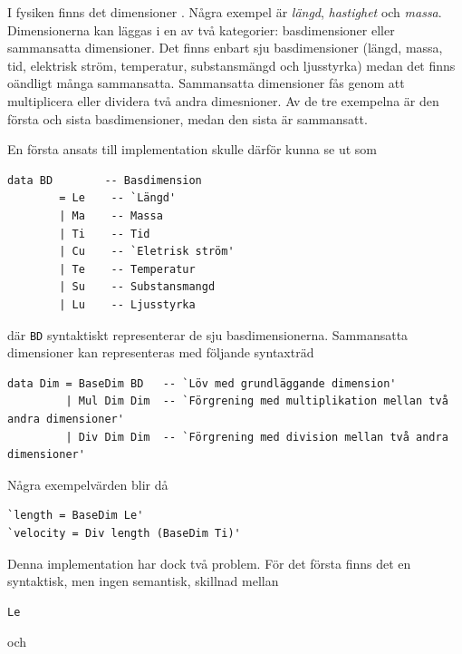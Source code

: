 \begin{draft}
I fysiken finns det dimensioner \cite{dimensioner_ne}. Några exempel är \textit{längd},
\textit{hastighet} och \textit{massa}. Dimensionerna kan läggas i en av två
kategorier: basdimensioner eller sammansatta dimensioner. Det finns enbart sju 
basdimensioner (längd, massa, tid, elektrisk ström, temperatur, substansmängd och
ljusstyrka) medan det finns oändligt många sammansatta. Sammansatta
dimensioner fås genom att multiplicera eller dividera två andra dimesnioner. Av
de tre exempelna är den första och sista basdimensioner, medan den sista är
sammansatt.

En första ansats till implementation skulle därför kunna se ut som

\begin{lstlisting}[frame=none, belowskip=-0.5\baselineskip, xleftmargin=0.5in]
 data BD        -- Basdimension
        = Le    -- `Längd'
        | Ma    -- Massa
        | Ti    -- Tid
        | Cu    -- `Eletrisk ström'
        | Te    -- Temperatur
        | Su    -- Substansmangd
        | Lu    -- Ljusstyrka
\end{lstlisting}

där \texttt{BD} syntaktiskt representerar de sju basdimensionerna.
Sammansatta dimensioner kan representeras med följande syntaxträd

\begin{lstlisting}[frame=none, belowskip=-0.5\baselineskip, xleftmargin=0.5in]
data Dim = BaseDim BD   -- `Löv med grundläggande dimension'
         | Mul Dim Dim  -- `Förgrening med multiplikation mellan två andra dimensioner'
         | Div Dim Dim  -- `Förgrening med division mellan två andra dimensioner'
\end{lstlisting}

Några exempelvärden blir då

\begin{lstlisting}[frame=none, belowskip=-0.5\baselineskip, xleftmargin=0.5in]
`length = BaseDim Le'
`velocity = Div length (BaseDim Ti)'
\end{lstlisting}

Denna implementation har dock två problem. För det första finns det en
syntaktisk, men ingen semantisk, skillnad mellan

\begin{lstlisting}[frame=none, belowskip=-0.5\baselineskip, xleftmargin=0.5in]
Le
\end{lstlisting}

och


\end{draft}
